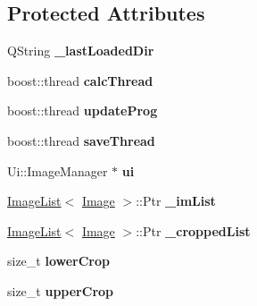 \subsection*{Protected Attributes}
\begin{DoxyCompactItemize}
\item 
Q\+String {\bfseries \+\_\+last\+Loaded\+Dir}\hypertarget{classImageManager_a431b9d2028e87f9e2de7598ea1fd0126}{}\label{classImageManager_a431b9d2028e87f9e2de7598ea1fd0126}

\item 
boost\+::thread {\bfseries calc\+Thread}\hypertarget{classImageManager_a5a9596a130499ca7cdb01a3288b26cce}{}\label{classImageManager_a5a9596a130499ca7cdb01a3288b26cce}

\item 
boost\+::thread {\bfseries update\+Prog}\hypertarget{classImageManager_a40f441562aba29f80326c64481b90be4}{}\label{classImageManager_a40f441562aba29f80326c64481b90be4}

\item 
boost\+::thread {\bfseries save\+Thread}\hypertarget{classImageManager_aa6fa36a5f712864b185d07e88ce16713}{}\label{classImageManager_aa6fa36a5f712864b185d07e88ce16713}

\item 
Ui\+::\+Image\+Manager $\ast$ {\bfseries ui}\hypertarget{classImageManager_aac7a0da284155ea2a3c7ad1d794c25db}{}\label{classImageManager_aac7a0da284155ea2a3c7ad1d794c25db}

\item 
\hyperlink{classImageList}{Image\+List}$<$ \hyperlink{classImage}{Image} $>$\+::Ptr {\bfseries \+\_\+im\+List}\hypertarget{classImageManager_acb3bf29229b6b7ce322301fd027bca79}{}\label{classImageManager_acb3bf29229b6b7ce322301fd027bca79}

\item 
\hyperlink{classImageList}{Image\+List}$<$ \hyperlink{classImage}{Image} $>$\+::Ptr {\bfseries \+\_\+cropped\+List}\hypertarget{classImageManager_af1be6b67382c51c0644ecf8b099a4c5f}{}\label{classImageManager_af1be6b67382c51c0644ecf8b099a4c5f}

\item 
size\+\_\+t {\bfseries lower\+Crop}\hypertarget{classImageManager_aa1a26ef032b956ac291c3e61b08071da}{}\label{classImageManager_aa1a26ef032b956ac291c3e61b08071da}

\item 
size\+\_\+t {\bfseries upper\+Crop}\hypertarget{classImageManager_a4073901ae2a2e73ea437a7ed31de4630}{}\label{classImageManager_a4073901ae2a2e73ea437a7ed31de4630}


\end{DoxyCompactItemize}
